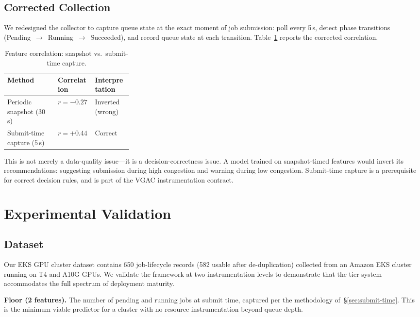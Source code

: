 \documentclass[sigconf]{acmart}
\begin{document}
\subsection{Corrected Collection}
We redesigned the collector to capture queue state at the exact moment of job submission: poll every 5\,s, detect phase transitions (Pending~$\to$~Running~$\to$~Succeeded), and record queue state at each transition. Table~\ref{tab:correlation} reports the corrected correlation.

\begin{table}[t]
\centering
\caption{Feature correlation: snapshot vs.\ submit-time capture.}
\label{tab:correlation}
\small
\begin{tabular}{@{}llp{0.3\linewidth}@{}}
\toprule
\textbf{Method} & \textbf{Correlation} & \textbf{Interpretation} \\
\midrule
Periodic snapshot (30\,s)   & $r=-0.27$ & Inverted (wrong) \\
Submit-time capture (5\,s)  & $r=+0.44$ & Correct \\
\bottomrule
\end{tabular}
\end{table}

This is not merely a data-quality issue---it is a decision-correctness issue. A model trained on snapshot-timed features would invert its recommendations: suggesting submission during high congestion and warning during low congestion. Submit-time capture is a prerequisite for correct decision rules, and is part of the VGAC instrumentation contract.

\section{Experimental Validation}
\label{sec:validation}

\subsection{Dataset}
Our EKS GPU cluster dataset contains 650 job-lifecycle records (582 usable after de-duplication) collected from an Amazon EKS cluster running on T4 and A10G GPUs. We validate the framework at two instrumentation levels to demonstrate that the tier system accommodates the full spectrum of deployment maturity.

\textbf{Floor (2 features).} The number of pending and running jobs at submit time, captured per the methodology of~\S\ref{sec:submit-time}. This is the minimum viable predictor for a cluster with no resource instrumentation beyond queue depth.
\end{document}
